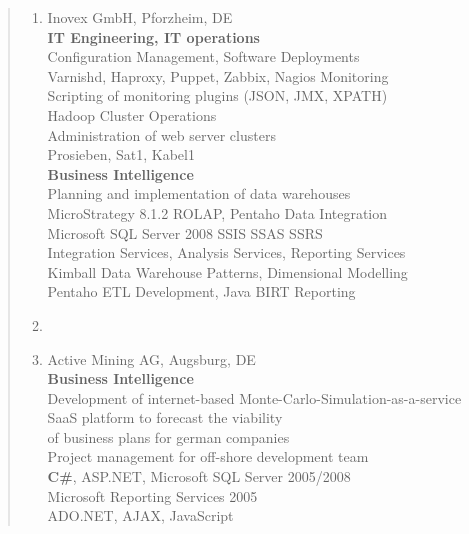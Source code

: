 \documentclass[a4paper]{report}
\begin{document}
\begin{quote}
\begin{enumerate}
\clearpage

\begin{flushleft}
  \section*{Work Experience 2007 - 2013 \\ \textit{Data is the new oil.}}
\end{flushleft}

\item[2008 - 2013]
                    Inovex GmbH, Pforzheim, DE\\
                    \textbf{IT Engineering, IT operations}\\
                    Configuration Management, Software Deployments\\
                    Varnishd, Haproxy, Puppet, Zabbix, Nagios Monitoring\\
                    Scripting of monitoring plugins (JSON, JMX, XPATH)\\
                    Hadoop Cluster Operations\\
                    Administration of web server clusters\\
                    Prosieben, Sat1, Kabel1\\
                    \textbf{Business Intelligence}\\
                    Planning and implementation of data warehouses\\
                    MicroStrategy 8.1.2 ROLAP, Pentaho Data Integration\\
                    Microsoft SQL Server 2008 SSIS SSAS SSRS\\
                    Integration Services, Analysis Services, Reporting Services\\
                    Kimball Data Warehouse Patterns, Dimensional Modelling\\
                    Pentaho ETL Development, Java BIRT Reporting

\item[ ]

\item[2008]         Active Mining AG, Augsburg, DE\\
                    \textbf{Business Intelligence}\\
                    Development of internet-based Monte-Carlo-Simulation-as-a-service\\
                    SaaS platform to forecast the viability\\
                    of business plans for german companies\\
                    Project management for off-shore development team\\
                    \textbf{C\#}, ASP.NET, Microsoft SQL Server 2005/2008\\
                    Microsoft Reporting Services 2005\\
                    ADO.NET, AJAX, JavaScript


\end{enumerate}
\end{quote}
\end{document}
